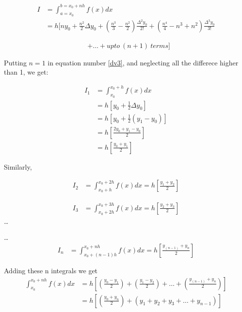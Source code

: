 \documentclass{article}
\begin{document}
              \begin{align*}
                I &=\int_{a=x_0}^{b=x_0+nh}f(x)dx\\
                  &= h[ny_0+\frac{n^2}{2}\Delta y_0+(\frac{n^3}{3}-\frac{n^2}{2})\frac{\Delta^2y_0}{2!}+(\frac{n^4}{4}-n^3+n^2)\frac{\Delta^3y_0}{3!}
              \end{align*}

              \begin{align}\label{dv3}
                  &+ \dots+upto\ (n+1)\ terms]
              \end{align}
              
              Putting $n=1$ in equation number \ref{dv3}, and neglecting all the differece 
              higher than 1, we get:
              
              \begin{align*}
                I_1 &= \int_{x_0}^{x_0+h}f(x)dx\\
                    &= h[y_0+\frac{1}{2}\Delta y_0]\\
                    &= h[y_0+\frac{1}{2}(y_1-y_0)]\\
                    &= h[\frac{2y_0+y_1-y_0}{2}]\\
                    &= h[\frac{y_0+y_1}{2}]
              \end{align*}
              
              Similarly,
              
              \begin{align*}
                I_2 &= \int_{x_0+h}^{x_0+2h}f(x)dx = h[\frac{y_1+y_2}{2}]
              \end{align*}
              
              \begin{align*}
                I_3 &= \int_{x_0+2h}^{x_0+3h}f(x)dx = h[\frac{y_2+y_3}{2}]
              \end{align*}
              \dots 
              
              \dots 
              \begin{align*}
                I_n &= \int_{x_0+(n-1)h}^{x_0+nh}f(x)dx = h[\frac{y_{(n-1)}+y_n}{2}]
              \end{align*}
              
              Adding these n integrals we get
              \begin{align*}
                \int_{x_0}^{x_0+nh}f(x)dx &= h[(\frac{y_0-y_1}{2})+(\frac{y_1-y_2}{2})+\dots+(\frac{y_{(n-1)}+y_n}{2})]\\
                                          &= h[(\frac{y_0+y_n}{2})+(y_1+y_2+y_3+\dots+y_{n-1})]
              \end{align*}
              
\end{document}
